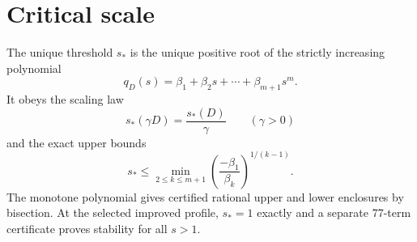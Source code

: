 \section*{Critical scale}
The unique threshold $s_*$ is the unique positive root of the strictly
increasing polynomial
\[
q_D(s)=\beta_1+\beta_2s+\cdots+\beta_{m+1}s^m.
\]
It obeys the scaling law
\[
s_*(\gamma D)=\frac{s_*(D)}{\gamma}\qquad(\gamma>0)
\]
and the exact upper bounds
\[
s_*\le \min_{2\le k\le m+1}
\left(\frac{-\beta_1}{\beta_k}\right)^{1/(k-1)}.
\]
The monotone polynomial gives certified rational upper and lower enclosures by
bisection.  At the selected improved profile, $s_*=1$ exactly and a separate
77-term certificate proves stability for all $s>1$.
